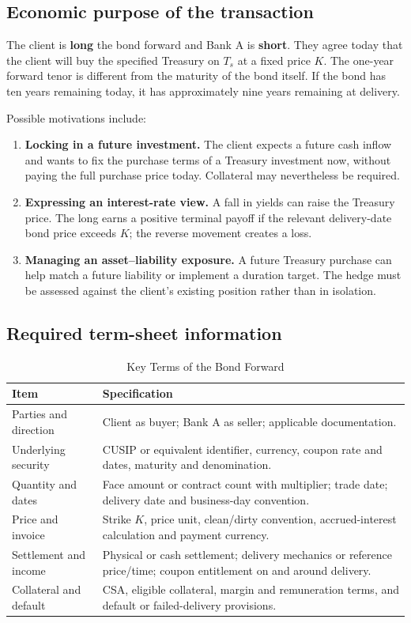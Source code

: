 \documentclass[11pt]{article}
\numberwithin{equation}{section}
\begin{document}
\subsection{Economic purpose of the transaction}
The client is \textbf{long} the bond forward and Bank A is \textbf{short}. They agree today that the client will buy the specified Treasury on $T_s$ at a fixed price $K$. The one-year forward tenor is different from the maturity of the bond itself. If the bond has ten years remaining today, it has approximately nine years remaining at delivery.

Possible motivations include:
\begin{enumerate}
\item \textbf{Locking in a future investment.} The client expects a future cash inflow and wants to fix the purchase terms of a Treasury investment now, without paying the full purchase price today. Collateral may nevertheless be required.
\item \textbf{Expressing an interest-rate view.} A fall in yields can raise the Treasury price. The long earns a positive terminal payoff if the relevant delivery-date bond price exceeds $K$; the reverse movement creates a loss.
\item \textbf{Managing an asset--liability exposure.} A future Treasury purchase can help match a future liability or implement a duration target. The hedge must be assessed against the client's existing position rather than in isolation.
\end{enumerate}

\subsection{Required term-sheet information}
\begin{table}[H]
\centering
\caption{Key Terms of the Bond Forward}
\label{tab:solution-2}
\small
\begin{tabularx}{\textwidth}{@{}L{3.0cm}Y@{}}
\toprule{}\textbf{Item} & \textbf{Specification}\\\midrule
Parties and direction & Client as buyer; Bank A as seller; applicable documentation.\\
Underlying security & CUSIP or equivalent identifier, currency, coupon rate and dates, maturity and denomination.\\
Quantity and dates & Face amount or contract count with multiplier; trade date; delivery date and business-day convention.\\
Price and invoice & Strike $K$, price unit, clean/dirty convention, accrued-interest calculation and payment currency.\\
Settlement and income & Physical or cash settlement; delivery mechanics or reference price/time; coupon entitlement on and around delivery.\\
Collateral and default & CSA, eligible collateral, margin and remuneration terms, and default or failed-delivery provisions.\\
\bottomrule
\end{tabularx}
\end{table}
\end{document}
